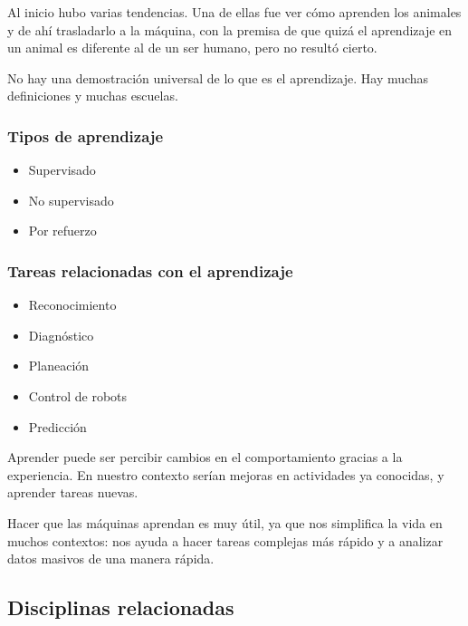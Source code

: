 \documentclass[11pt,letterpaper]{article}
\begin{document}
Al inicio hubo varias tendencias. Una de ellas fue ver cómo aprenden
los animales y de ahí trasladarlo a la máquina, con la premisa de que
quizá el aprendizaje en un animal es diferente al de un ser humano,
pero no resultó cierto.

\begin{ojo}
  No hay una demostración universal de lo que es el aprendizaje. Hay
  muchas definiciones y muchas escuelas.
\end{ojo}

\subsubsection*{Tipos de aprendizaje}

\begin{itemize}[itemsep=0.1em]
    \item Supervisado
    \item No supervisado
    \item Por refuerzo
\end{itemize}

\subsubsection*{Tareas relacionadas con el aprendizaje}

\begin{itemize}[itemsep=0.1em]
    \item Reconocimiento
    \item Diagnóstico
    \item Planeación
    \item Control de robots
    \item Predicción
\end{itemize}

Aprender puede ser percibir cambios en el comportamiento gracias a la
experiencia. En nuestro contexto serían mejoras en actividades ya
conocidas, y aprender tareas nuevas.

Hacer que las máquinas aprendan es muy útil, ya que nos simplifica la
vida en muchos contextos: nos ayuda a hacer tareas complejas más
rápido y a analizar datos masivos de una manera rápida.


\subsection*{Disciplinas relacionadas}
\end{document}
